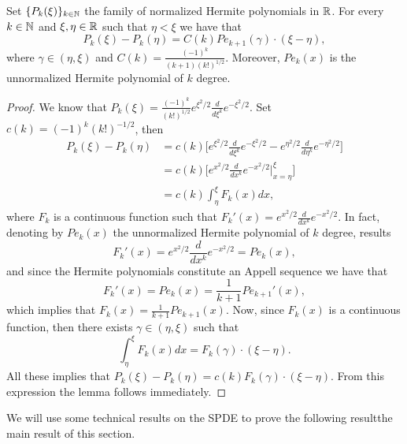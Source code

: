 \documentclass[review,onefignum,onetabnum]{siamart190516}
\begin{document}
\begin{lemma}\label{le-s3-1}
 Set $\{P_k(\xi)\}_{k\in {\mathbb N}}$ the family of normalized Hermite polynomials in
${\mathbb R}$. For every $k\in{\mathbb N}$ and $\xi,
 \eta\in{\mathbb R}$ such that
 $\eta<\xi$ we have that
 \begin{equation}
  P_k(\xi)-P_k(\eta)= C(k)  Pe_{k+1}(\gamma) \cdot (\xi-\eta), \label{Pk-dif}
 \end{equation}
where $\gamma\in (\eta,\xi)$ and $C(k)=\frac{(-1)^k}{(k+1)(k!)^{1/2}} $.
Moreover, $Pe_k(x)$ is the
unnormalized Hermite polynomial of $k$ degree.
\end{lemma}
\begin{proof}
 We know that
 $
     P_k(\xi)=\frac{(-1)^k}{(k!)^{1/2}} e^{\xi^2/2}\frac{d}{d\xi^k}e^{-\xi^2/2}.
 $
 Set $c(k)=(-1)^k (k!)^{-1/2}$, then
\begin{align*}
    P_k(\xi)-P_k(\eta)
        &=c(k)
        \Big[
            e^{\xi^2/2}
            \frac{d}{d\xi^k} e^{-\xi ^ 2/2} - e^{\eta^2/2}
            \frac{d}{d\eta^k} e^{-\eta ^ 2/2}
        \Big] 
        \\
    & =c(k)
        \Bigg[
            e^{x^2/2} \frac{d}{dx^k} e^{-x^2/2}
        \Big|_{x=\eta}^\xi\Bigg]
        \\
    & = c(k) \int_{\eta}^\xi F_k(x) dx,
\end{align*}
where $F_k$ is a continuous function such that
$F_k'(x)=e^{x^2/2}\frac{d}{dx^k}e^{-x^2/2}$. In fact, denoting by $Pe_k(x)$
the
unnormalized Hermite polynomial of $k$ degree, results
$$
    F_k'(x)=e^{x^2/2}\frac{d}{dx^k}e^{-x^2/2}= Pe_k(x),
$$
and since the Hermite polynomials constitute an Appell sequence we have that
$$
    F_k'(x)=Pe_k(x)=\frac{1}{k+1} Pe_{k+1}'(x),
$$
which implies that $F_k(x)=\frac{1}{k+1} Pe_{k+1}(x)$. Now, since $F_k(x)$ is
a continuous function, then there exists
$\gamma\in (\eta,\xi)$ such that
$$
    \int_{\eta}^\xi F_k(x) dx = F_k(\gamma)\cdot (\xi-\eta).
$$
 All these implies that
$
    P_k(\xi)-P_k(\eta)= c(k) F_k(\gamma) \cdot (\xi-\eta).
$
    From this expression the lemma follows immediately.
\end{proof}

We will use some technical results on the SPDE to prove
the following result\textemdash the main result of this section.
\end{document}
